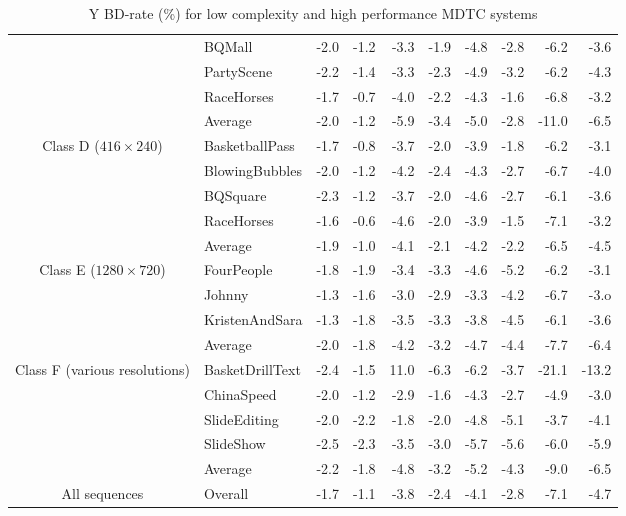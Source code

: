 \documentclass[11pt,a4paper,openright,twoside]{book}
\numberwithin{equation}{section} %
\numberwithin{figure}{section} %
\numberwithin{table}{section} %
\begin{document}
\begin{table}[tb]
\begin{tabularx}{\textwidth}{c|X|rr|rr|rr|rr}
		& BQMall                 & -2.0 & -1.2 & -3.3 & -1.9 & -4.8 & -2.8 &  -6.2 &  -3.6 \\
		& PartyScene             & -2.2 & -1.4 & -3.3 & -2.3 & -4.9 & -3.2 &  -6.2 &  -4.3 \\
		& RaceHorses             & -1.7 & -0.7 & -4.0 & -2.2 & -4.3 & -1.6 &  -6.8 &  -3.2 \\
		\cline{2-10} &
		Average                  & -2.0 & -1.2 & -5.9 & -3.4 & -5.0 & -2.8 & -11.0 &  -6.5 \\
		\hline
		\hline
		\multirow{5}{2cm}{\centering Class D ($416\times240$)}
		& BasketballPass         & -1.7 & -0.8 & -3.7 & -2.0 & -3.9 & -1.8 &  -6.2 & -3.1  \\
		& BlowingBubbles         & -2.0 & -1.2 & -4.2 & -2.4 & -4.3 & -2.7 &  -6.7 & -4.0  \\
		& BQSquare               & -2.3 & -1.2 & -3.7 & -2.0 & -4.6 & -2.7 &  -6.1 & -3.6  \\
		& RaceHorses             & -1.6 & -0.6 & -4.6 & -2.0 & -3.9 & -1.5 &  -7.1 & -3.2  \\
		\cline{2-10} &
		Average                  & -1.9 & -1.0 & -4.1 & -2.1 & -4.2 & -2.2 &  -6.5 & -4.5  \\
		\hline
		\hline
		\multirow{4}{2cm}{\centering Class E ($1280\times720$)}
		& FourPeople             & -1.8 & -1.9 & -3.4 & -3.3 & -4.6 & -5.2 &  -6.2 & -3.1  \\
		& Johnny                 & -1.3 & -1.6 & -3.0 & -2.9 & -3.3 & -4.2 &  -6.7 & -3.o  \\
		& KristenAndSara         & -1.3 & -1.8 & -3.5 & -3.3 & -3.8 & -4.5 &  -6.1 & -3.6  \\
		\cline{2-10} &
		Average                  & -2.0 & -1.8 & -4.2 & -3.2 & -4.7 & -4.4 &  -7.7 & -6.4  \\
		\hline
		\hline
		\multirow{5}{2cm}{\centering Class F (various resolutions)}
		& BasketDrillText        & -2.4 & -1.5 & 11.0 & -6.3 & -6.2 & -3.7 & -21.1 & -13.2 \\
		& ChinaSpeed             & -2.0 & -1.2 & -2.9 & -1.6 & -4.3 & -2.7 &  -4.9 &  -3.0 \\
		& SlideEditing           & -2.0 & -2.2 & -1.8 & -2.0 & -4.8 & -5.1 &  -3.7 &  -4.1 \\
		& SlideShow              & -2.5 & -2.3 & -3.5 & -3.0 & -5.7 & -5.6 &  -6.0 &  -5.9 \\
		\cline{2-10} &
		Average                  & -2.2 & -1.8 & -4.8 & -3.2 & -5.2 & -4.3 &  -9.0 &  -6.5 \\
		\hline
		\hline
		All sequences &
		Overall                  & -1.7 & -1.1 & -3.8 & -2.4 & -4.1 & -2.8 &  -7.1 &  -4.7 \\
	\end{tabularx}
	\caption{Y \acs{BD}-rate (\%) for low complexity and high performance \acs{MDTC} systems}
	\label{tab:bd_rate_mdtc}
\end{table}
\end{document}
